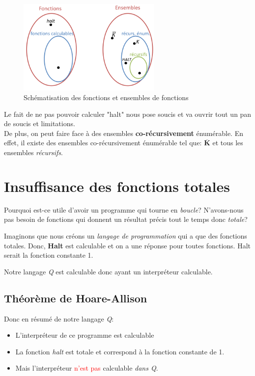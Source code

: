 \documentclass{report}
\begin{document}
\begin{figure}[H]
\centering
\includegraphics[width=7cm]{img/ensembleFonction.png}
\caption{Schématisation des fonctions et ensembles de fonctions}
\end{figure}

Le fait de ne pas pouvoir calculer "halt" nous pose soucis et va ouvrir tout un pan de soucis et limitations.\\

De plus, on peut faire face à des ensembles \textbf{co-récursivement} énumérable. En effet, il existe des ensembles co-récursivement énumérable tel que: $\overline{\textbf{K}}$ et tous les ensembles \textit{récursifs}. \label{coreq}

\section{Insuffisance des fonctions totales}
Pourquoi est-ce utile d'avoir un programme qui tourne en \textit{boucle}? N'avons-nous pas besoin de fonctions qui donnent un résultat précis tout le temps donc \textit{totale}?

Imaginons que nous créons un \textit{langage de programmation} qui a que des fonctions totales.
Donc, \textbf{Halt} est calculable et on a une réponse pour toutes fonctions. Halt serait la fonction constante 1.

Notre langage \textit{Q} est calculable donc ayant un interpréteur calculable.

\subsection{Théorème de Hoare-Allison} \label{HA}
Donc en résumé de notre langage \textit{Q}:
\begin{itemize}
\item L'interpréteur de ce programme est calculable
\item La fonction \textit{halt} est totale et correspond à la fonction constante de 1.
\item Mais l'interpréteur \textcolor{red}{n'est pas} calculable \textit{dans Q}.
\end{itemize}
\end{document}
